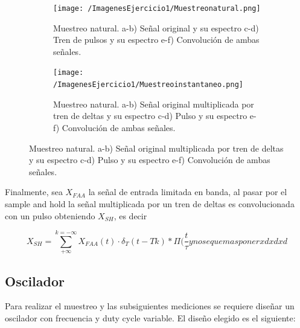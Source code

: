 \begin{figure}[H]
\centering
\begin{subfigure}[b]{.45\linewidth}
\texttt{[image: /ImagenesEjercicio1/Muestreonatural.png]}
\caption{Muestreo natural. a-b) Señal original y su espectro c-d) Tren de pulsos y su espectro e-f) Convolución de ambas señales.}
\label{fig:muestreonatural}
\end{subfigure}
\begin{subfigure}[b]{.45\linewidth}
\texttt{[image: /ImagenesEjercicio1/Muestreoinstantaneo.png]}
\caption{Muestreo natural. a-b) Señal original multiplicada por tren de deltas y su espectro c-d) Pulso y su espectro e-f) Convolución de ambas señales.}
\label{fig:muestreoinstantaneo}
\end{subfigure}
\end{figure}

Finalmente, sea $X_{FAA}$ la señal de entrada limitada en banda, al pasar por el sample and hold la señal multiplicada por un tren de deltas es convolucionada con un pulso obteniendo $X_{SH}$, es decir

\begin{equation}
X_{SH} = \sum_{+\infty}^{k = -\infty}X_{FAA}(t)\cdot \delta_T(t-Tk) * \Pi(\frac{t}{\tau} y no se que mas poner xdxdxd
\end{equation}

\subsection{Oscilador}

Para realizar el muestreo y las subsiguientes mediciones se requiere diseñar un oscilador con frecuencia y duty cycle variable. El diseño elegido es el siguiente:

